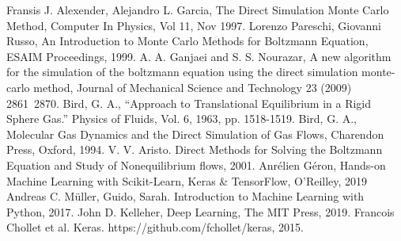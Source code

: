 \documentclass{article}
\begin{document}
\begin{thebibliography}{99}
	Fransis J. Alexender, Alejandro L. Garcia, The Direct Simulation Monte Carlo Method, Computer In Physics, Vol 11, Nov 1997.
	Lorenzo Pareschi, Giovanni Russo, An Introduction to Monte Carlo Methods for Boltzmann Equation, ESAIM Proceedings, 1999.
	A. A. Ganjaei and S. S. Nourazar, A new algorithm for the simulation of the boltzmann equation using the direct simulation monte-carlo method, Journal of Mechanical Science and Technology 23 (2009) 2861~2870.
	Bird, G. A., “Approach to Translational Equilibrium in a Rigid Sphere Gas.” Physics of Fluids, Vol. 6, 1963, pp. 1518-1519.
	Bird, G. A., Molecular Gas Dynamics and the Direct Simulation of Gas Flows, Charendon Press, Oxford, 1994.
	 V. V. Aristo. Direct Methods for Solving the Boltzmann Equation and Study of Nonequilibrium flows, 2001.
	Anr\'{e}lien G\'{e}ron, Hands-on Machine Learning with Scikit-Learn, Keras \& TensorFlow, O'Reilley, 2019
	Andreas C. Müller, Guido, Sarah. Introduction to Machine Learning with Python, 2017.
	John D. Kelleher, Deep Learning, The MIT Press, 2019.
	Francois Chollet et al. Keras. https://github.com/fchollet/keras, 2015.
\end{thebibliography}
\end{document}
